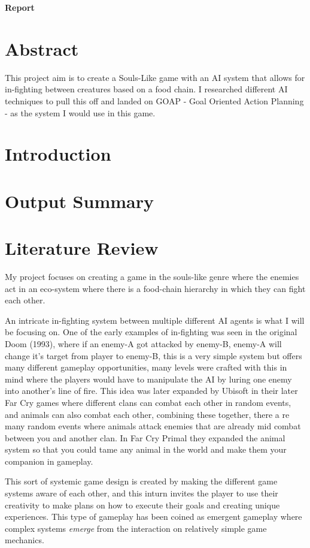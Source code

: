 \documentclass[12pt]{report}
\begin{document}
\begin{titlepage}
\center
{\huge\bfseries Report}  
\end{titlepage}

\tableofcontents

\chapter{Abstract}
This project aim is to create a Souls-Like game with an AI system that allows for in-fighting between creatures based on a food chain. I researched different AI techniques to pull this off and landed on GOAP - Goal Oriented Action Planning - as the system I would use in this game.
\chapter{Introduction}
\chapter{Output Summary}
\chapter{Literature Review}
My project focuses on creating a game in the souls-like genre where the enemies act in an eco-system where there is a food-chain hierarchy in which they can fight each other.

An intricate in-fighting system between multiple different AI agents is what I will be focusing on. One of the early examples of in-fighting was seen in the original Doom (1993)\cite{doom93}, where if an enemy-A got attacked by enemy-B, enemy-A will change it's target from player to enemy-B, this is a very simple system but offers many different gameplay opportunities, many levels were crafted with this in mind where the players would have to manipulate the AI by luring one enemy into another's line of fire.
This idea was later expanded by Ubisoft in their later Far Cry games where different clans can combat each other in random events, and animals can also combat each other, combining these together, there a re many random events where animals attack enemies that are already mid combat between you and another clan. In Far Cry Primal they expanded the animal system so that you could tame any animal in the world and make them your companion in gameplay.

This sort of systemic game design is created by making the different game systems aware of each other, and this inturn invites the player to use their creativity to make plans on how to execute their goals and creating unique experiences. This type of gameplay has been coined as emergent gameplay where complex systems \textit{emerge} from the interaction on relatively simple game mechanics.\cite{emergentGameplay}
\end{document}
